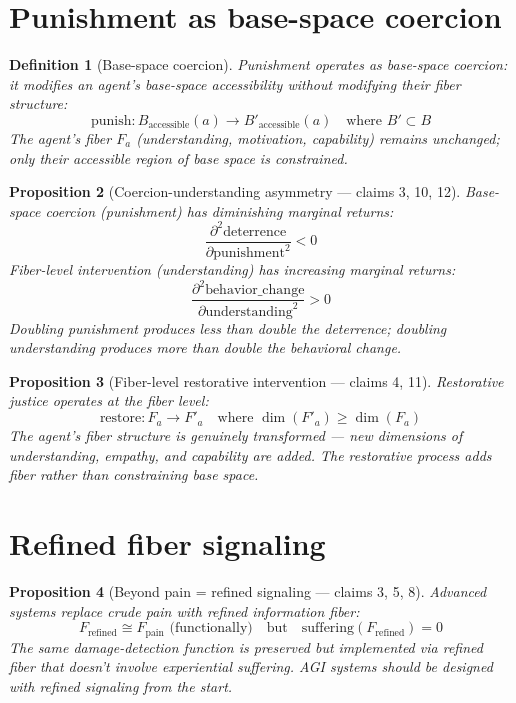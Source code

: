 \documentclass[11pt,a4paper]{article}
\newtheorem{definition}{Definition}[section]
\newtheorem{proposition}[definition]{Proposition}
\begin{document}
\section{Punishment as base-space coercion}

\begin{definition}[Base-space coercion]
\emph{Punishment} operates as base-space coercion: it modifies an agent's
base-space accessibility without modifying their fiber structure:
\[
  \text{punish}: B_{\text{accessible}}(a) \to B'_{\text{accessible}}(a)
  \quad \text{where } B' \subset B
\]
The agent's fiber $F_a$ (understanding, motivation, capability) remains
unchanged; only their accessible region of base space is constrained.
\end{definition}

\begin{proposition}[Coercion-understanding asymmetry --- claims 3, 10, 12]
\label{prop:asymmetry}
Base-space coercion (punishment) has diminishing marginal returns:
\[
  \frac{\partial^2 \text{deterrence}}{\partial \text{punishment}^2} < 0
\]
Fiber-level intervention (understanding) has increasing marginal returns:
\[
  \frac{\partial^2 \text{behavior\_change}}{\partial \text{understanding}^2} > 0
\]
Doubling punishment produces less than double the deterrence; doubling
understanding produces more than double the behavioral change.
\end{proposition}

\begin{proposition}[Fiber-level restorative intervention --- claims 4, 11]
\label{prop:restorative}
Restorative justice operates at the fiber level:
\[
  \text{restore}: F_a \to F'_a \quad \text{where }
  \dim(F'_a) \geq \dim(F_a)
\]
The agent's fiber structure is genuinely transformed --- new dimensions
of understanding, empathy, and capability are added. The restorative
process adds fiber rather than constraining base space.
\end{proposition}


\section{Refined fiber signaling}

\begin{proposition}[Beyond pain = refined signaling --- claims 3, 5, 8]
Advanced systems replace crude pain with refined information fiber:
\[
  F_{\text{refined}} \cong F_{\text{pain}} \text{ (functionally)}
  \quad \text{but} \quad \text{suffering}(F_{\text{refined}}) = 0
\]
The same damage-detection function is preserved but implemented via
refined fiber that doesn't involve experiential suffering. AGI systems
should be designed with refined signaling from the start.
\end{proposition}
\end{document}
